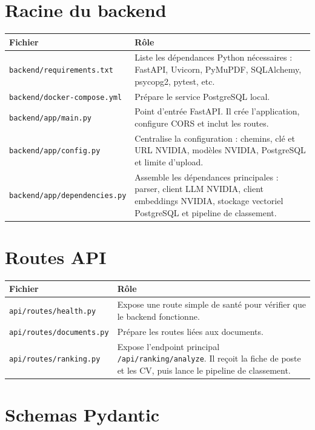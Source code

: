 \documentclass[12pt,a4paper]{report}
\begin{document}
\section{Racine du backend}

\begin{longtable}{|p{5cm}|p{9cm}|}
\hline
\textbf{Fichier} & \textbf{Rôle} \\
\hline
\endhead
\texttt{backend/requirements.txt} & Liste les dépendances Python nécessaires : FastAPI, Uvicorn, PyMuPDF, SQLAlchemy, psycopg2, pytest, etc. \\
\hline
\texttt{backend/docker-compose.yml} & Prépare le service PostgreSQL local. \\
\hline
\texttt{backend/app/main.py} & Point d'entrée FastAPI. Il crée l'application, configure CORS et inclut les routes. \\
\hline
\texttt{backend/app/config.py} & Centralise la configuration : chemins, clé et URL NVIDIA, modèles NVIDIA, PostgreSQL et limite d'upload. \\
\hline
\texttt{backend/app/dependencies.py} & Assemble les dépendances principales : parser, client LLM NVIDIA, client embeddings NVIDIA, stockage vectoriel PostgreSQL et pipeline de classement. \\
\hline
\end{longtable}

\section{Routes API}

\begin{longtable}{|p{5cm}|p{9cm}|}
\hline
\textbf{Fichier} & \textbf{Rôle} \\
\hline
\endhead
\texttt{api/routes/health.py} & Expose une route simple de santé pour vérifier que le backend fonctionne. \\
\hline
\texttt{api/routes/documents.py} & Prépare les routes liées aux documents. \\
\hline
\texttt{api/routes/ranking.py} & Expose l'endpoint principal \texttt{/api/ranking/analyze}. Il reçoit la fiche de poste et les CV, puis lance le pipeline de classement. \\
\hline
\end{longtable}

\section{Schemas Pydantic}
\end{document}
